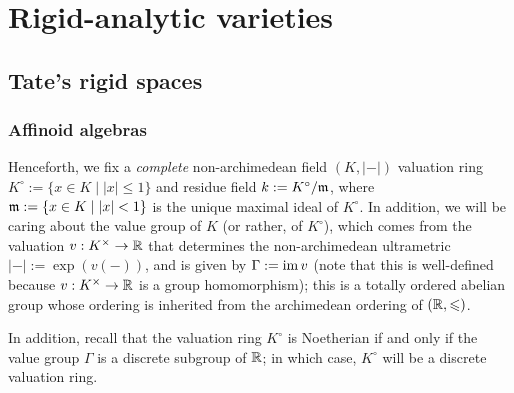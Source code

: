 \section{Rigid-analytic varieties}
    \subsection{Tate's rigid spaces}
        \subsubsection{Affinoid algebras}
            \begin{convention}
                Henceforth, we fix a \textit{complete} non-archimedean field $(K, |-|)$ valuation ring $K^{\circ} := \{x \in K \mid |x| \leq 1\}$ and residue field $k := K^{\circ}/\mathfrak{m}$, where $\mathfrak{m} := \{x \in K \mid |x| < 1\}$ is the unique maximal ideal of $K^{\circ}$. In addition, we will be caring about the value group of $K$ (or rather, of $K^{\circ}$), which comes from the valuation $v: K^{\x} \to \R$ that determines the non-archimedean ultrametric $|-| := \exp(v(-))$, and is given by $\Gamma := \operatorname{im} v$ (note that this is well-defined because $v: K^{\x} \to \R$ is a group homomorphism); this is a totally ordered abelian group whose ordering is inherited from the archimedean ordering of $(\mathbb{R}, \leqslant)$.
            \end{convention}
            \begin{remark}
                In addition, recall that the valuation ring $K^{\circ}$ is Noetherian if and only if the value group $\Gamma$ is a discrete subgroup of $\mathbb{R}$; in which case, $K^{\circ}$ will be a discrete valuation ring.
            \end{remark}
            
